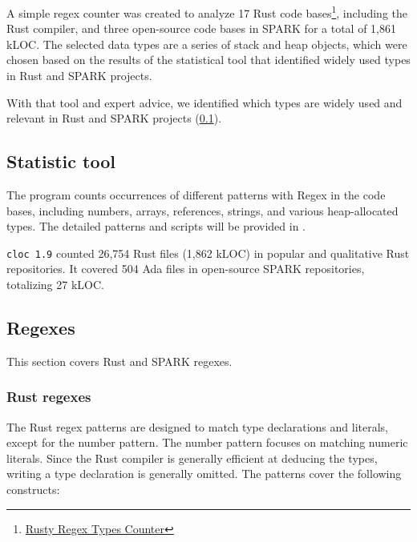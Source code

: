 \documentclass[nomenclature, english, bibtex]{kththesis}
\begin{document}
A simple regex counter was created to analyze 17 Rust code bases\footnote{\href{https://github.com/Dajamante/stat_ada_rust_code}{Rusty Regex Types Counter}}, including the Rust compiler, and three open-source code bases in SPARK for a total of 1,861 k\gls{LOC}. The selected data types are a series of stack and heap objects, which were chosen based on the results of the statistical tool that identified widely used types in Rust and SPARK projects. 

With that tool and expert advice, we identified which types are widely used and relevant in Rust and SPARK projects (\cref{sec:stats}).

\subsection{Statistic tool}
\label{sec:stats}


The program counts occurrences of different patterns with Regex in the code bases, including numbers, arrays, references, strings, and various heap-allocated types. The detailed patterns and scripts will be provided in .

\texttt{cloc 1.9} counted 26,754 Rust files (1,862 k\gls{LOC}) in popular and qualitative Rust repositories. It covered 504 Ada files in open-source SPARK repositories, totalizing 27 kLOC.

\subsection{Regexes}
This section covers Rust and SPARK regexes.
\subsubsection{Rust regexes}

The Rust regex patterns are designed to match type declarations and literals, except for the number pattern. The number pattern focuses on matching numeric literals. Since the Rust compiler is generally efficient at deducing the types, writing a type declaration is generally omitted. The patterns cover the following constructs:
\end{document}
